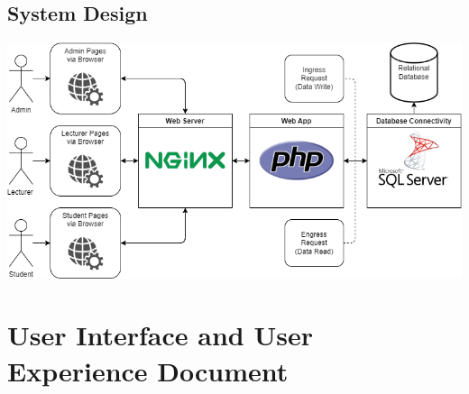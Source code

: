 \documentclass[12pt,titlepage,a4paper]{report}
\begin{document}
    \section{System Design}
    \begin{center}
        \includegraphics[width=\textwidth]{images/figures/Diagram/SystemDesign.dio.png}
    \end{center}
\chapter{User Interface and User Experience Document}
\end{document}
